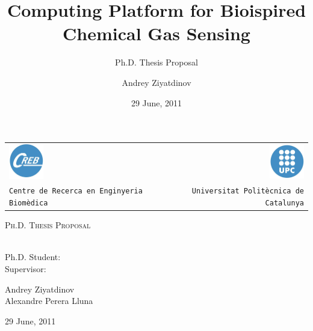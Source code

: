 \documentclass{beamer}
\title[\textnormal{Ph.D. Thesis Proposal \hspace{15em} \insertframenumber/\inserttotalframenumber}]{Computing Platform for Bioispired Chemical Gas Sensing}
\subtitle{Ph.D. Thesis Proposal}
\author[\textnormal{Andrey Ziyatdinov}]{Andrey Ziyatdinov}
\date{29 June, 2011}
\renewcommand{\emph}[1]{{\color{MainBlue}{#1}}}
\begin{document}
\begin{frame}[plain]
  \begin{center}
    \begin{tabular}[\textwidth]{lp{1cm}r}
      \includegraphics[width=1.5cm]{logos/creb.jpg}
      &
      &
      \includegraphics[width=1.5cm]{logos/upc.jpg}\\
      \texttt{\tiny Centre de Recerca en Enginyeria Biomèdica}
      &
      &
      \texttt{\tiny Universitat Politècnica de Catalunya}
    \end{tabular}
  \end{center}

  \begin{center}
    \textsc{\Large Ph.D. Thesis Proposal}\\[0.5cm]
    {\huge \emph{Computing Platform for Bioispired Chemical Gas Sensing}}\\[0.4cm]

    \begin{minipage}{0.25\textwidth}
    \begin{flushleft} %
      Ph.D. Student: \\
      Supervisor: 
    \end{flushleft}
    \end{minipage}
    \begin{minipage}{0.6\textwidth}
    \begin{flushleft} %
      Andrey Ziyatdinov \\
      Alexandre Perera Lluna
    \end{flushleft}
    \end{minipage}
    
    \vfill

    {\large 29 June, 2011}
  \end{center}

\end{frame}
\end{document}
